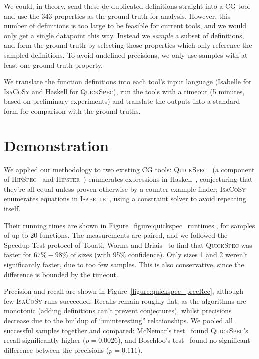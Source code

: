 \documentclass[]{default}
\begin{document}
We could, in theory, send these de-duplicated definitions straight into a CG
tool and use the 343 properties as the ground truth for analysis. However, this
number of definitions is too large to be feasible for current tools, and we
would only get a single datapoint this way. Instead we \emph{sample} a subset of
definitions, and form the ground truth by selecting those properties which only
reference the sampled definitions. To avoid undefined precisions, we only use
samples with at least one ground-truth property.

We translate the function definitions into each tool's input language (Isabelle
for \textsc{IsaCoSy} and Haskell for \textsc{QuickSpec}), run the tools with a
timeout (5 minutes, based on preliminary experiments) and translate the outputs
into a standard form for comparison with the ground-truths.

\section{Demonstration}

We applied our methodology to two existing CG tools:
\textsc{QuickSpec}~\cite{QuickSpec} (a component of
\textsc{HipSpec}~\cite{Claessen_hipspec:automating} and
\textsc{Hipster}~\cite{Hipster}) enumerates expressions in
Haskell~\cite{marlow2010haskell}, conjecturing that they're all equal unless
proven otherwise by a counter-example finder;
\textsc{IsaCoSy}~\cite{johansson2009isacosy} enumerates equations in
\textsc{Isabelle}~\cite{nipkow2002isabelle}, using a constraint solver to avoid
repeating itself.

Their running times are shown in Figure~\ref{figure:quickspec_runtimes}, for
samples of up to 20 functions. The measurements are paired, and we followed the
Speedup-Test protocol of Touati, Worms and Briais~\cite{touati2013speedup} to
find that \textsc{QuickSpec} was faster for $67\%-98\%$ of sizes (with 95\%
confidence). Only sizes 1 and 2 weren't significantly faster, due to too few
samples. This is also conservative, since the difference is bounded by the
timeout.

Precision and recall are shown in Figure~\ref{figure:quickspec_precRec},
although few \textsc{IsaCoSy} runs succeeded. Recalls remain roughly flat, as
the algorithms are monotonic (adding definitions can't prevent conjectures),
whilst precisions decrease due to the buildup of ``uninteresting''
relationships. We pooled all successful samples together and compared: McNemar's
test~\cite{mcnemar1947note} found \textsc{QuickSpec}'s recall significantly
higher ($p = 0.0026$), and Boschloo's test~\cite{lydersen2009recommended} found
no significant difference between the precisions ($p = 0.111$).
\end{document}

